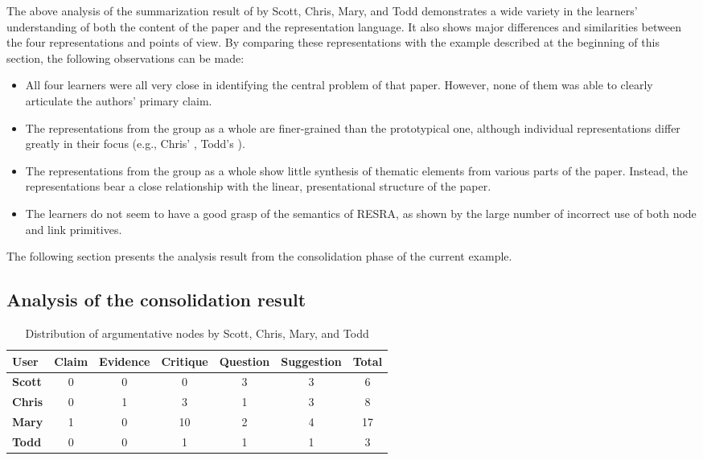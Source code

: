 The above analysis of the summarization result of \cite{Flynn90} by Scott,
Chris, Mary, and Todd demonstrates a wide variety in the learners'
understanding of both the content of the paper and the representation
language. It also shows major differences and similarities between the four
representations and points of view. By comparing these representations with
the example described at the beginning of this section, the following
observations can be made:

\begin{itemize}
\item All four learners were all very close in identifying the central
  problem of that paper. However, none of them was able to clearly
  articulate the authors' primary claim.
  
\item The representations from the group as a whole are finer-grained
  than the prototypical one, although individual representations differ
  greatly in their focus (e.g., Chris' , Todd's
  ).

\item The representations from the group as a whole show little synthesis of
  thematic elements from various parts of the paper.  Instead, the
  representations bear a close relationship with the linear, presentational
  structure of the paper.
  
\item The learners do not seem to have a good grasp of the semantics of
  RESRA, as shown by the large number of incorrect use of both node and
  link primitives.
\end{itemize}

The following section presents the analysis result from the consolidation
phase of the current example.


\subsection{Analysis of the consolidation result}

\small
\begin{table}[hbtp]
\caption{Distribution of argumentative nodes by Scott, Chris, Mary, and Todd}
\begin{center}
\begin{tabular} {||l|c|c|c|c|c||c||} \hline
{\sf User} & {\bf Claim} & {\bf Evidence} & {\bf Critique} & {\bf Question}
& {\bf Suggestion} & {\bf Total} \\ \hline \hline
{\bf Scott}  & 0 & 0 & 0  & 3 & 3 & 6  \\ \hline
{\bf Chris\/}& 0 & 1 & 3  & 1 & 3 & 8  \\ \hline
{\bf Mary\/} & 1 & 0 & 10 & 2 & 4 & 17 \\ \hline
{\bf Todd\/} & 0 & 0 & 1  & 1 & 1 & 3  \\ 
 \hline
\end{tabular}
\end{center}
\label{tab:resra-dist-phase2}
\end{table}
\normalsize
{}

